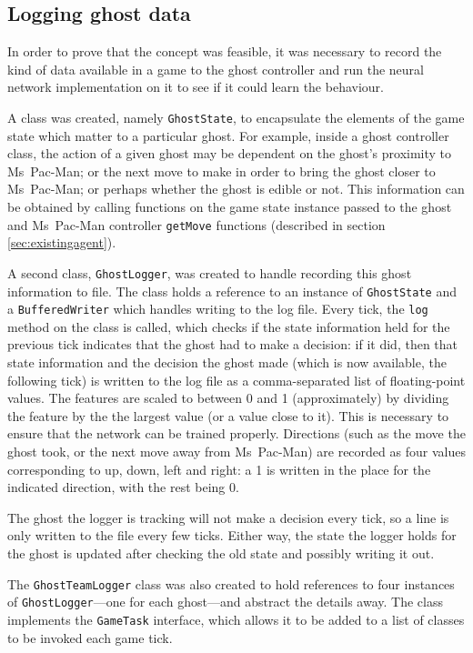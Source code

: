 \subsection{Logging ghost data}

In order to prove that the concept was feasible, it was necessary to record the kind of data available in a game to the ghost controller and run the neural network implementation on it to see if it could learn the behaviour.

A class was created, namely {\tt GhostState}, to encapsulate the elements of the game state which matter to a particular ghost.  For example, inside a ghost controller class, the action of a given ghost may be dependent on the ghost's proximity to Ms~Pac-Man; or the next move to make in order to bring the ghost closer to Ms~Pac-Man; or perhaps whether the ghost is edible or not.  This information can be obtained by calling functions on the game state instance passed to the ghost and Ms~Pac-Man controller {\tt getMove} functions (described in section \ref{sec:existingagent}).

A second class, {\tt GhostLogger}, was created to handle recording this ghost information to file. The class holds a reference to an instance of {\tt GhostState} and a {\tt BufferedWriter} which handles writing to the log file.  Every tick, the {\tt log} method on the class is called, which checks if the state information held for the previous tick indicates that the ghost had to make a decision: if it did, then that state information and the decision the ghost made (which is now available, the following tick) is written to the log file as a comma-separated list of floating-point values.  The features are scaled to between 0 and 1 (approximately) by dividing the feature by the the largest value (or a value close to it).  This is necessary to ensure that the network can be trained properly.  Directions (such as the move the ghost took, or the next move away from Ms~Pac-Man) are recorded as four values corresponding to up, down, left and right: a 1 is written in the place for the indicated direction, with the rest being 0.

The ghost the logger is tracking will not make a decision every tick, so a line is only written to the file every few ticks.  Either way, the state the logger holds for the ghost is updated after checking the old state and possibly writing it out.

The {\tt GhostTeamLogger} class was also created to hold references to four instances of {\tt GhostLogger}---one for each ghost---and abstract the details away.  The class implements the {\tt GameTask} interface, which allows it to be added to a list of classes to be invoked each game tick.

